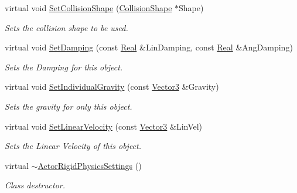 \begin{DoxyCompactItemize}
virtual void \hyperlink{classphys_1_1ActorRigidPhysicsSettings_a97f3fcda5a669847138c6c3665192d92}{SetCollisionShape} (\hyperlink{classphys_1_1CollisionShape}{CollisionShape} $\ast$Shape)
\begin{DoxyCompactList}\small\item\em Sets the collision shape to be used. \item\end{DoxyCompactList}\item 
virtual void \hyperlink{classphys_1_1ActorRigidPhysicsSettings_abcb4e6a9ec828ac7f70075e5e70b529b}{SetDamping} (const \hyperlink{namespacephys_af7eb897198d265b8e868f45240230d5f}{Real} \&LinDamping, const \hyperlink{namespacephys_af7eb897198d265b8e868f45240230d5f}{Real} \&AngDamping)
\begin{DoxyCompactList}\small\item\em Sets the Damping for this object. \item\end{DoxyCompactList}\item 
virtual void \hyperlink{classphys_1_1ActorRigidPhysicsSettings_af595556bb71a257785038b6c2da379a9}{SetIndividualGravity} (const \hyperlink{classphys_1_1Vector3}{Vector3} \&Gravity)
\begin{DoxyCompactList}\small\item\em Sets the gravity for only this object. \item\end{DoxyCompactList}\item 
virtual void \hyperlink{classphys_1_1ActorRigidPhysicsSettings_a65cda21e8cd8837f057349d05de15f18}{SetLinearVelocity} (const \hyperlink{classphys_1_1Vector3}{Vector3} \&LinVel)
\begin{DoxyCompactList}\small\item\em Sets the Linear Velocity of this object. \item\end{DoxyCompactList}\item 
\hypertarget{classphys_1_1ActorRigidPhysicsSettings_a8c8d4581ff653208bbe5ddaad84feb4d}{
virtual \hyperlink{classphys_1_1ActorRigidPhysicsSettings_a8c8d4581ff653208bbe5ddaad84feb4d}{$\sim$ActorRigidPhysicsSettings} ()}
\label{classphys_1_1ActorRigidPhysicsSettings_a8c8d4581ff653208bbe5ddaad84feb4d}

\begin{DoxyCompactList}\small\item\em Class destructor. \item\end{DoxyCompactList}\end{DoxyCompactItemize}
